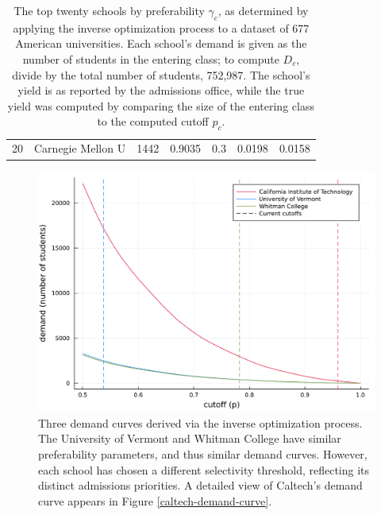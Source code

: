 \documentclass[12pt]{article}
\theoremstyle{definition}
\begin{document}
\begin{table}[]
\begin{tabular}{r|l|r|l|l|l|l}
20                                 & Carnegie Mellon U                     & 1442                                 & 0.9035                  & 0.3            & 0.0198              & 0.0158                             
\end{tabular}
\caption{\label{tab:US-inverse-optimization}
The top twenty schools by preferability $\gamma_c$, as determined by applying the inverse optimization process to a dataset of 677 American universities. Each school's demand is given as the number of students in the entering class; to compute $D_c$, divide by the total number of students, 752,987. The school's yield is as reported by the admissions office, while the true yield was computed by comparing the size of the entering class to the computed cutoff $p_c$.}
\end{table}





\begin{figure}
\begin{center}\includegraphics[width=\linewidth, ]{plots/three-demand-curves.pdf}\end{center}
\captionsetup{singlelinecheck=off}
    \caption[.]{Three demand curves derived via the inverse optimization process. The University of Vermont and Whitman College have similar preferability parameters, and thus similar demand curves. However, each school has chosen a different selectivity threshold, reflecting its distinct admissions priorities. A detailed view of Caltech's demand curve appears in Figure \ref{caltech-demand-curve}.}
\label{three-demand-curves}
\end{figure}
\end{document}
